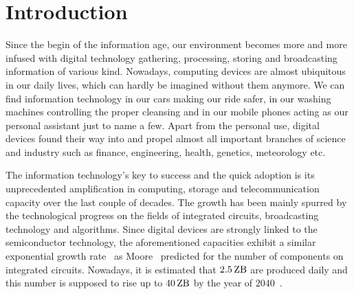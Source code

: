 \documentclass{dima}
\begin{document}
\date{\today}


\maketitle



\section{Introduction}
 Since the begin of the information age, our environment becomes more and more infused with digital technology gathering, processing, storing and broadcasting information of various kind.
 Nowadays, computing devices are almost ubiquitous in our daily lives, which can hardly be imagined without them anymore.
 We can find information technology in our cars making our ride safer, in our washing machines controlling the proper cleansing and in our mobile phones acting as our personal assistant just to name a few.
 Apart from the personal use, digital devices found their way into and propel almost all important branches of science and industry such as finance, engineering, health, genetics, meteorology etc.

 The information technology's key to success and the quick adoption is its unprecedented amplification in computing, storage and telecommunication capacity over the last couple of decades.
 The growth has been mainly spurred by the technological progress on the fields of integrated circuits, broadcasting technology and algorithms.
 Since digital devices are strongly linked to the semiconductor technology, the aforementioned capacities exhibit a similar exponential growth rate~\cite{hilbert:s2011a} as Moore~\cite{moore:1965a} predicted for the number of components on integrated circuits.
 Nowadays, it is estimated that $\SI{2.5}{\zetta\byte}$ are produced daily and this number is supposed to rise up to $\SI{40}{\zetta\byte}$ by the year of $\num{2040}$~\cite{ibm:2014a}.
\end{document}
